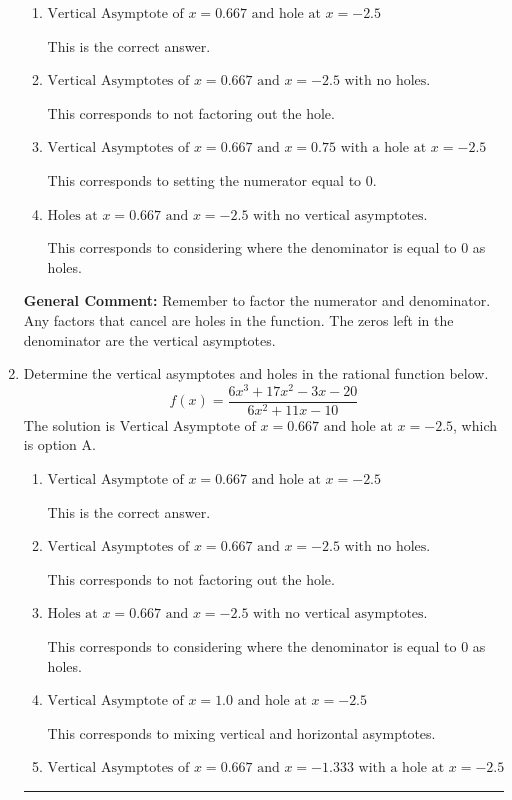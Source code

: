 \documentclass{extbook}[14pt]
\newcommand{\litem}[1]{\item #1

\rule{\textwidth}{0.4pt}}
\begin{document}
\begin{enumerate}
{\begin{enumerate}[label=\Alph*.]
This corresponds to mixing vertical and horizontal asymptotes.
\item \( \text{Vertical Asymptote of } x = 0.667 \text{ and hole at } x = -2.5 \)

This is the correct answer.
\item \( \text{Vertical Asymptotes of } x = 0.667 \text{ and } x = -2.5 \text{ with no holes.} \)

This corresponds to not factoring out the hole.
\item \( \text{Vertical Asymptotes of } x = 0.667 \text{ and } x = 0.75 \text{ with a hole at } x = -2.5 \)

This corresponds to setting the numerator equal to 0.
\item \( \text{Holes at } x = 0.667 \text{ and } x = -2.5 \text{ with no vertical asymptotes.} \)

This corresponds to considering where the denominator is equal to 0 as holes.
\end{enumerate}

\textbf{General Comment:} Remember to factor the numerator and denominator. Any factors that cancel are holes in the function. The zeros left in the denominator are the vertical asymptotes.
}
\litem{
Determine the vertical asymptotes and holes in the rational function below.
\[ f(x) = \frac{6x^{3} +17 x^{2} -3 x -20}{6x^{2} +11 x -10} \]The solution is \( \text{Vertical Asymptote of } x = 0.667 \text{ and hole at } x = -2.5 \), which is option A.\begin{enumerate}[label=\Alph*.]
\item \( \text{Vertical Asymptote of } x = 0.667 \text{ and hole at } x = -2.5 \)

This is the correct answer.
\item \( \text{Vertical Asymptotes of } x = 0.667 \text{ and } x = -2.5 \text{ with no holes.} \)

This corresponds to not factoring out the hole.
\item \( \text{Holes at } x = 0.667 \text{ and } x = -2.5 \text{ with no vertical asymptotes.} \)

This corresponds to considering where the denominator is equal to 0 as holes.
\item \( \text{Vertical Asymptote of } x = 1.0 \text{ and hole at } x = -2.5 \)

This corresponds to mixing vertical and horizontal asymptotes.
\item \( \text{Vertical Asymptotes of } x = 0.667 \text{ and } x = -1.333 \text{ with a hole at } x = -2.5 \)


\end{enumerate}}
\end{enumerate}
\end{document}
